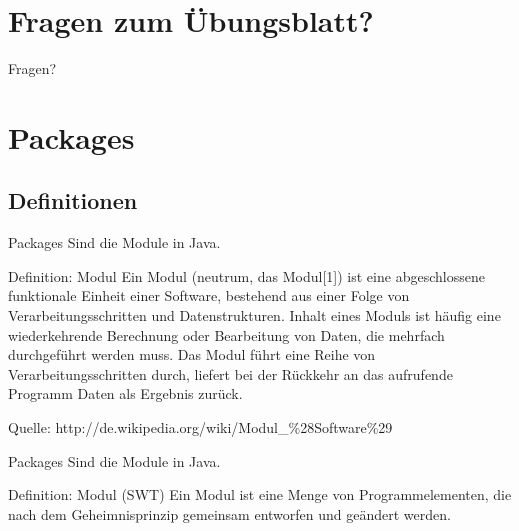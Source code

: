 \documentclass[18pt]{beamer}
\begin{document}
\section{Fragen zum Übungsblatt?}
\begin{frame}{Fragen?}
\end{frame}






\section{Packages}
\subsection{Definitionen}
\begin{frame}{Packages}
 Sind die Module in Java. \pause
 
 \begin{exampleblock}{Definition: Modul}
  Ein Modul (neutrum, das Modul[1]) ist eine abgeschlossene funktionale Einheit einer Software, 
  bestehend aus einer Folge von Verarbeitungsschritten und Datenstrukturen. Inhalt eines Moduls ist
  häufig eine wiederkehrende Berechnung oder Bearbeitung von Daten, die mehrfach durchgeführt 
  werden muss. Das Modul führt eine Reihe von Verarbeitungsschritten durch, liefert bei der 
  Rückkehr an das aufrufende Programm Daten als Ergebnis zurück.
  
  \tiny{Quelle: http://de.wikipedia.org/wiki/Modul\_\%28Software\%29 }
 \end{exampleblock}

\end{frame}

\begin{frame}{Packages}
 Sind die Module in Java. \pause
 
 \begin{exampleblock}{Definition: Modul (SWT)}
 Ein Modul ist eine Menge von Programmelementen, die nach dem Geheimnisprinzip gemeinsam entworfen und geändert werden.

 \end{exampleblock}

\end{frame}
\end{document}
